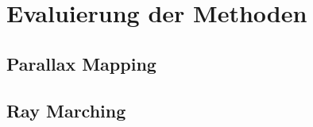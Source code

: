 \section{Evaluierung der Methoden}
\label{sec:5}
\noindent

\subsection{Parallax Mapping}
\subsection{Ray Marching}